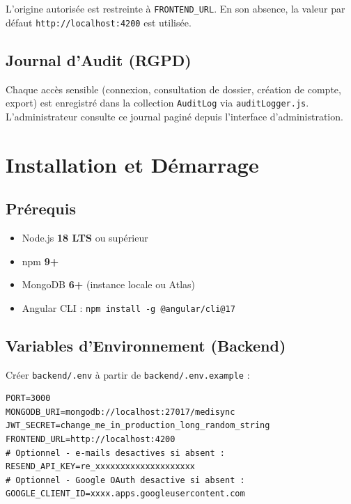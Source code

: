 \documentclass[12pt,a4paper]{report}
\begin{document}
L'origine autorisée est restreinte à \texttt{FRONTEND\_URL}. En son absence, la valeur par défaut \texttt{http://localhost:4200} est utilisée.

\section{Journal d'Audit (RGPD)}

Chaque accès sensible (connexion, consultation de dossier, création de compte, export) est enregistré dans la collection \texttt{AuditLog} via \texttt{auditLogger.js}. L'administrateur consulte ce journal paginé depuis l'interface d'administration.

\chapter{Installation et Démarrage}

\section{Prérequis}

\begin{itemize}[leftmargin=*,itemsep=2pt]
  \item Node.js \textbf{18 LTS} ou supérieur
  \item npm \textbf{9+}
  \item MongoDB \textbf{6+} (instance locale ou Atlas)
  \item Angular CLI : \texttt{npm install -g @angular/cli@17}
\end{itemize}

\section{Variables d'Environnement (Backend)}

Créer \texttt{backend/.env} à partir de \texttt{backend/.env.example} :

\begin{lstlisting}[style=bash]
PORT=3000
MONGODB_URI=mongodb://localhost:27017/medisync
JWT_SECRET=change_me_in_production_long_random_string
FRONTEND_URL=http://localhost:4200
# Optionnel - e-mails desactives si absent :
RESEND_API_KEY=re_xxxxxxxxxxxxxxxxxxxx
# Optionnel - Google OAuth desactive si absent :
GOOGLE_CLIENT_ID=xxxx.apps.googleusercontent.com
\end{lstlisting}
\end{document}
